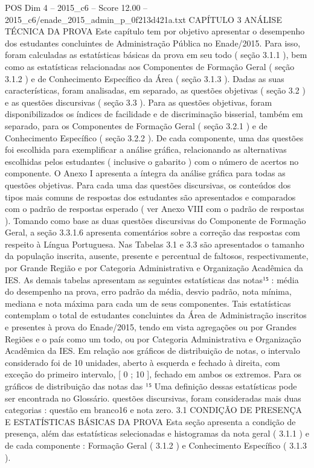 \begin{textsample}{POS Dim 4 – 2015\_c6 – Score 12.00 – 2015\_c6/enade\_2015\_admin\_p\_0f213d421a.txt}  \label{ex:f4_pos_029}
CAPÍTULO 3 ANÁLISE TÉCNICA DA PROVA Este capítulo tem por objetivo apresentar o desempenho dos estudantes concluintes de Administração Pública no Enade/2015.
Para isso, foram calculadas as estatísticas básicas da prova em seu todo ( seção 3.1.1 ), bem como as estatísticas relacionadas aos Componentes de Formação Geral ( seção 3.1.2 ) e de Conhecimento Específico da Área ( seção 3.1.3 ).
Dadas as suas características, foram analisadas, em separado, as questões objetivas ( seção 3.2 ) e as questões discursivas ( seção 3.3 ).
Para as questões objetivas, foram disponibilizados os índices de facilidade e de discriminação bisserial, também em separado, para os Componentes de Formação Geral ( seção 3.2.1 ) e de Conhecimento Específico ( seção 3.2.2 ).
De cada componente, uma das questões foi escolhida para exemplificar a análise gráfica, relacionando as alternativas escolhidas pelos estudantes ( inclusive o gabarito ) com o número de acertos no componente.
O Anexo I apresenta a íntegra da análise gráfica para todas as questões objetivas.
Para cada uma das questões discursivas, os conteúdos dos tipos mais comuns de respostas dos estudantes são apresentados e comparados com o padrão de respostas esperado ( ver Anexo VIII com o padrão de respostas ).
Tomando como base as duas questões discursivas do Componente de Formação Geral, a seção 3.3.1.6 apresenta comentários sobre a correção das respostas com respeito à Língua Portuguesa.
Nas Tabelas 3.1 e 3.3 são apresentados o tamanho da população inscrita, ausente, presente e percentual de faltosos, respectivamente, por Grande Região e por Categoria Administrativa e Organização Acadêmica da IES.
As demais tabelas apresentam as seguintes estatísticas das notas¹⁵ : média do desempenho na prova, erro padrão da média, desvio padrão, nota mínima, mediana e nota máxima para cada um de seus componentes.
Tais estatísticas contemplam o total de estudantes concluintes da Área de Administração inscritos e presentes à prova do Enade/2015, tendo em vista agregações ou por Grandes Regiões e o país como um todo, ou por Categoria Administrativa e Organização Acadêmica da IES.
Em relação aos gráficos de distribuição de notas, o intervalo considerado foi de 10 unidades, aberto à esquerda e fechado à direita, com exceção do primeiro intervalo, [ 0 ; 10 ], fechado em ambos os extremos.
Para os gráficos de distribuição das notas das ¹⁵ Uma definição dessas estatísticas pode ser encontrada no Glossário. questões discursivas, foram consideradas mais duas categorias : questão em branco16 e nota zero. 3.1 CONDIÇÃO DE PRESENÇA E ESTATÍSTICAS BÁSICAS DA PROVA Esta seção apresenta a condição de presença, além das estatísticas selecionadas e histogramas da nota geral ( 3.1.1 ) e de cada componente : Formação Geral ( 3.1.2 ) e Conhecimento Específico ( 3.1.3 ).

\end{textsample}
